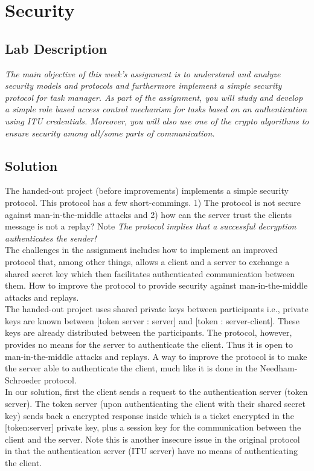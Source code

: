 \chapter{Security}
\minitoc

\section{Lab Description}
\textit{The main objective of this week's assignment is to understand and analyze security models and protocols and furthermore implement a simple security protocol for task manager. As part of the assignment, you will study and develop a simple role based access control mechanism for tasks based on an authentication using ITU credentials. Moreover, you will also use one of the crypto algorithms to ensure security among all/some parts of communication.}

\section{Solution}

The handed-out project (before improvements) implements a simple security protocol. This protocol has a few short-commings. 1) The protocol is not secure against man-in-the-middle attacks and 2) how can the server trust the clients message is not a replay? Note \textit{The protocol implies that a successful decryption authenticates the sender!} \\

The challenges in the assignment includes how to implement an improved protocol that, among other things, allows a client and a server to exchange a shared secret key which then facilitates authenticated communication between them. How to improve the protocol to provide security against man-in-the-middle attacks and replays.  \\

The handed-out project uses shared private keys between participants i.e., private keys are known between [token server : server] and [token : server-client]. These keys are already distributed between the participants. The protocol, however, provides no means for the server to authenticate the client. Thus it is open to man-in-the-middle attacks and replays. A way to improve the protocol is to make the server able to authenticate the client, much like it is done in the Needham-Schroeder protocol.\\


In our solution, first the client sends a request to the authentication server (token server). The token server (upon authenticating the client with their shared secret key) sends back a encrypted response inside which is a ticket encrypted in the [token:server] private key, plus a session key for the communication between the client and the server. Note this is another insecure issue in the original protocol in that the authentication server (ITU server) have no means of authenticating the client. \\


